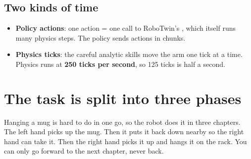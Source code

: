\documentclass[11pt,a4paper]{article}
\newcommand{\code}[1]{\texttt{\detokenize{#1}}}
\begin{document}
\subsection{Two kinds of time}
\begin{itemize}
  \item \textbf{Policy actions}: one action = one call to RoboTwin's \code{take_action}, which itself runs many physics steps. The policy sends actions in chunks.
  \item \textbf{Physics ticks}: the careful analytic skills move the arm one tick at a time. Physics runs at \textbf{250 ticks per second}, so 125 ticks is half a second.
\end{itemize}

\section{The task is split into three phases}

\begin{eli5}
Hanging a mug is hard to do in one go, so the robot does it in three chapters. The left hand picks
up the mug. Then it puts it back down nearby so the right hand can take it. Then the right hand
picks it up and hangs it on the rack. You can only go forward to the next chapter, never back.
\end{eli5}
\end{document}
